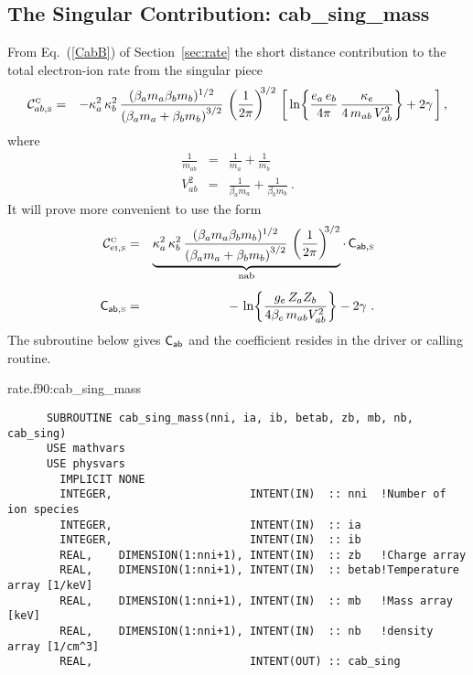 \documentclass[preprint,12pt,eqsecnum,nofootinbib,amsmath,amssymb]{revtex4}
\newcommand{\smC}{{\rm\scriptscriptstyle C}}
\newcommand{\smI}{{\rm\scriptscriptstyle I}}
\newcommand{\smS}{{\rm\scriptscriptstyle S}}
\begin{document}
{{{{\subsection{The Singular Contribution: cab\_sing\_mass}

From Eq.~(\ref{CabB}) of  Section~\ref{sec:rate} the short distance
contribution to the total electron-ion rate from the singular piece
\begin{eqnarray}
  {\cal C}^\smC_{ab,\smS} 
  &=& 
  -{\kappa_a^2\, \kappa_b^2 } \,
  \frac{ (\beta_a m_a \beta_b m_b)^{1/2}}{\left( \beta_a m_a + 
  \beta_b m_b \right)^{3/2} } \,
  \left( \frac{1}{2\pi} \right)^{\!\!3/2}\, 
  \left[\,\ln\!\left\{ \frac{e_a\,e_b}{4 \pi}\,
  \frac{\kappa_e}{4 \, m_{ab} \, V^2_{ab}}\right\} 
  + 2 \gamma\,  \right]  ,
\label{CeISA}
\end{eqnarray}
where
\begin{eqnarray}
  \frac{1}{m_{ab}} &=& \frac{1}{m_a} + \frac{1}{m_b} 
\\[5pt]
  V_{ab}^2 &=& \frac{1}{\beta_a m_a} + \frac{1}{\beta_b m_b} \ .
\end{eqnarray}
It will prove more convenient to use the form
\begin{eqnarray}
  {\cal C}^\smC_{e\smI,\smS} 
  &=& 
  \underbrace{
  {\kappa_a^2\, \kappa_b^2 } \,
  \frac{ (\beta_a m_a \beta_b m_b)^{1/2}}{\left( \beta_a m_a + 
  \beta_b m_b \right)^{3/2} }\,   \left( \frac{1}{2\pi}
  \right)^{\!\!3/2}}_\text{nab} \cdot \, 
  \sf{C}_{ab, \smS}
\\[5pt]
  \sf{C}_{ab, \smS}
  &=&
  -\,\ln\!\left\{ \frac{g_e\,Z_a Z_b}{4 \beta_e\, m_{ab} V_{ab}^2}\right\} 
  - 2 \gamma \ .
\label{CeISB}
\end{eqnarray}
The subroutine below gives $\sf{C}_{ab}$ and the coefficient resides
in the driver or calling routine. 

\vskip0.4cm 
\noindent
rate.f90:cab\_sing\_mass
{
\baselineskip 10pt
\begin{verbatim}
      SUBROUTINE cab_sing_mass(nni, ia, ib, betab, zb, mb, nb, cab_sing)
      USE mathvars
      USE physvars
        IMPLICIT NONE
        INTEGER,                     INTENT(IN)  :: nni  !Number of ion species
        INTEGER,                     INTENT(IN)  :: ia
        INTEGER,                     INTENT(IN)  :: ib
        REAL,    DIMENSION(1:nni+1), INTENT(IN)  :: zb   !Charge array
        REAL,    DIMENSION(1:nni+1), INTENT(IN)  :: betab!Temperature array [1/keV]
        REAL,    DIMENSION(1:nni+1), INTENT(IN)  :: mb   !Mass array [keV]
        REAL,    DIMENSION(1:nni+1), INTENT(IN)  :: nb   !density array [1/cm^3]
        REAL,                        INTENT(OUT) :: cab_sing


\end{verbatim}}}}}}
\end{document}
